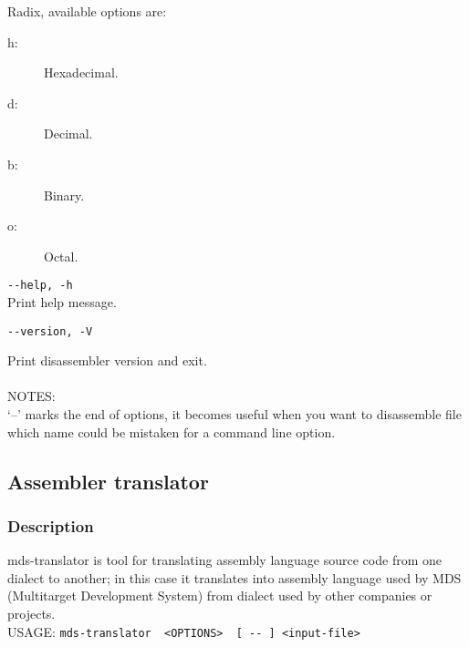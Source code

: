                 Radix, available options are:
                \begin{description}
                    \item [h:] Hexadecimal.
                    \item [d:] Decimal.
                    \item [b:] Binary.
                    \item [o:] Octal.
                \end{description}
                {
                \usecodefont
                \verb'--help, -h'\\
                }
                Print help message.
                {
                \usecodefont

                \verb'--version, -V'\\
                }
                Print disassembler version and exit.\\\\
                NOTES:\\
                `--' marks the end of options, it becomes useful when you want to disassemble file which name could be mistaken for a command line option.
    \subsection{Assembler translator}
        \subsubsection{Description}
            mds-translator is tool for translating assembly language source code from one dialect to another; in this case it translates
            into assembly language used by MDS (Multitarget Development System) from dialect used by other companies or projects.\\

            USAGE:
            {
                \usecodefont
                \verb'mds-translator  <OPTIONS>  [ -- ] <input-file>'\\
            }
